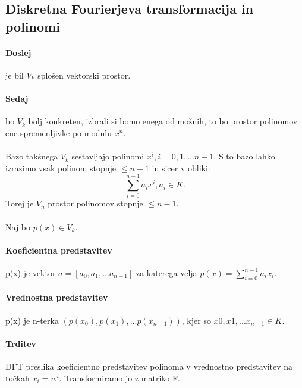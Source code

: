 \documentclass[a4paper,10pt]{article}
\begin{document}
\subsection{Diskretna Fourierjeva transformacija in polinomi}
\paragraph{Doslej}
je bil $V_k$ splo\v sen vektorski prostor.

\paragraph{Sedaj}
bo $V_k$ bolj konkreten, izbrali si bomo enega od mo\v znih, to bo prostor polinomov ene spremenljivke po modulu $x^n$.\\
\\
Bazo tak\v snega $V_k$ sestavljajo polinomi $x^i, i=0,1,...n-1$. S to bazo lahko izrazimo vsak polinom stopnje $\leq n-1$ in sicer v obliki:
$$
\sum_{i=0}^{n-1} a_ix^i, a_i \in K \mbox{.}
$$
Torej je $V_n$ prostor polinomov stopnje $\leq n-1$.\\
\\
Naj bo $p(x) \in V_k$.

\paragraph{Koeficientna predstavitev} p(x) je vektor $a=[a_0,a_1,...a_{n-1}]$ za katerega velja $p(x) =  \sum_{i=0}^{n-1} a_{i}x_{i}$.

\paragraph{Vrednostna predstavitev} p(x) je n-terka $(p(x_{0}), p(x_{1}),... p(x_{n-1}))$, kjer so $x0, x1,... x_{n-1} \in K$.

\paragraph{Trditev} DFT preslika koeficientno predstavitev polinoma v vrednostno predstavitev na to\v ckah $x_{i} = w^{i}$. Transformiramo jo z matriko F.
\end{document}
